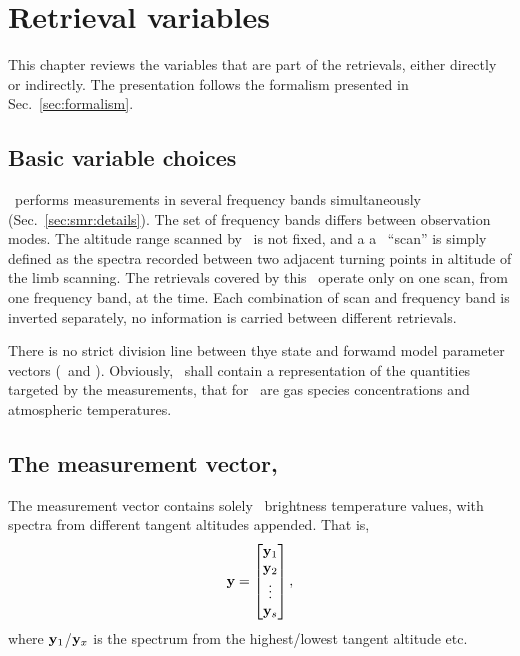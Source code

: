 \chapter{Retrieval variables}
\label{chapter:retvars}

This chapter reviews the variables that are part of the retrievals, either
directly or indirectly. The presentation follows the formalism presented in
Sec.~\ref{sec:formalism}.


\section{Basic variable choices}
\label{sec:retr:basics}
%
\smr\ performs measurements in several frequency bands simultaneously
(Sec.~\ref{sec:smr:details}). The set of frequency bands differs between observation
modes\addref. The altitude range scanned by \smr\ is not fixed, and a a \smr\
``scan'' is simply defined as the spectra recorded between two adjacent turning
points in altitude of the limb scanning\addref. The retrievals covered by this
\ATBD\ operate only on one scan, from one frequency band, at the time. Each
combination of scan and frequency band is inverted separately, no information
is carried between different retrievals.

There is no strict division line between thye state and forwamd model parameter
vectors (\SttVct\ and \FrwMdlVct). Obviously, \SttVct\ shall contain a
representation of the quantities targeted by the measurements, that for \smr\
are gas species concentrations and atmospheric temperatures.\todo{Finish thsi
  discussion.}



\section{The measurement vector, \MsrVct}
\label{sec:y}
%
The measurement vector contains solely \smr\ brightness temperature values,
with spectra from different tangent altitudes appended. That is,
\begin{equation}
  \label{eq:y}
  \mathbf{y} =
  \begin{bmatrix}
    \mathbf{y}_1\\ 
    \mathbf{y}_2\\ 
    \vdots\\ 
    \mathbf{y}_s
  \end{bmatrix},
\end{equation}
where $\mathbf{y}_1$/$\mathbf{y}_x$ is the spectrum from the highest/lowest tangent
altitude etc. 


